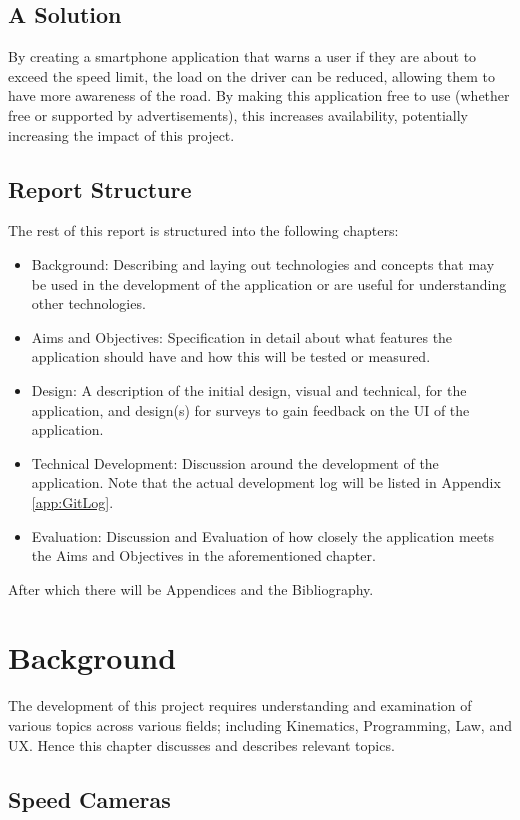 \documentclass[11pt, a4paper, notitlepage]{report}
\begin{document}
\section{A Solution}
By creating a smartphone application that warns a user if they are about to exceed the speed limit, the load on the driver can be reduced, allowing them to have more awareness of the road. By making this application free to use (whether free or supported by advertisements), this increases availability, potentially increasing the impact of this project.
\section{Report Structure}
The rest of this report is structured into the following chapters:
\begin{itemize}
	\item Background: Describing and laying out technologies and concepts that may be used in the development of the application or are useful for understanding other technologies.
	\item Aims and Objectives: Specification in detail about what features the application should have and how this will be tested or measured.
	\item Design: A description of the initial design, visual and technical, for the application, and design(s) for surveys to gain feedback on the UI of the application.
	\item Technical Development: Discussion around the development of the application. Note that the actual development log will be listed in Appendix \ref{app:GitLog}.
    \item Evaluation: Discussion and Evaluation of how closely the application meets the Aims and Objectives in the aforementioned chapter.
\end{itemize}
After which there will be Appendices and the Bibliography. %
\chapter{Background}
The development of this project requires understanding and examination of various topics across various fields; including Kinematics, Programming, Law, and UX. Hence this chapter discusses and describes relevant topics.
\section{Speed Cameras}
\end{document}
